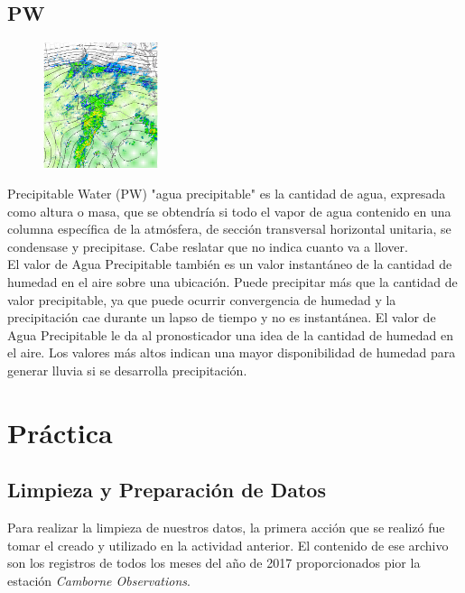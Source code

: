 \documentclass[12pt]{article}
\begin{document}
\subsection*{PW}
\begin{figure}
    \centering
    \includegraphics[width=0.3\textwidth]{PW.png}
\end{figure}
Precipitable Water (PW) "agua precipitable" es la cantidad de agua, expresada como altura o masa, que se obtendría si todo el vapor de agua contenido en una columna específica de la atmósfera, de sección transversal horizontal unitaria, se condensase y precipitase. Cabe reslatar que no indica cuanto va a llover.\\

El valor de Agua Precipitable también es un valor instantáneo de la cantidad de humedad en el aire sobre una ubicación. Puede precipitar más que la cantidad de valor precipitable, ya que puede ocurrir convergencia de humedad y la precipitación cae durante un lapso de tiempo y no es instantánea.
El valor de Agua Precipitable le da al pronosticador una idea de la cantidad de humedad en el aire. Los valores más altos indican una mayor disponibilidad de humedad para generar lluvia si se desarrolla precipitación.
 
\section*{Práctica}

\subsection*{Limpieza y Preparación de Datos}
Para realizar la limpieza de nuestros datos, la primera acción que se realizó fue tomar el creado y utilizado en la actividad anterior. El contenido de ese archivo son los registros de todos los meses del año de 2017 proporcionados pior la estación \textit{Camborne Observations}.\\
\end{document}
